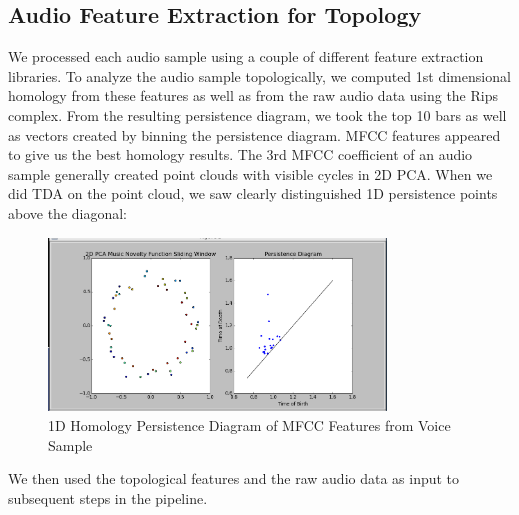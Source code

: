 \documentclass[12pt]{article}
\begin{document}
\subsection{Audio Feature Extraction for Topology}
\-\hspace{1cm} We processed each audio sample using a couple of different
feature extraction libraries. To analyze the audio sample topologically, we
computed 1st dimensional homology from these features as well as from the raw
audio data using the Rips complex. From the resulting persistence diagram, we
took the top 10 bars as well as vectors created by binning the persistence
diagram.
\newline \-\hspace{1cm} MFCC features appeared to give us the best homology
results. The 3rd MFCC coefficient of an audio sample generally created point
clouds with visible cycles in 2D PCA. When we did TDA on the point cloud, we
saw clearly distinguished 1D persistence points above the diagonal:
\newpage
\begin{figure}[!ht]
\centering
\includegraphics[width=0.8\textwidth]{pd.png}
\caption{1D Homology Persistence Diagram of MFCC Features from Voice Sample}
\end{figure}
\-\hspace{1cm} We then used the topological features and the raw audio
data as input to subsequent steps in the pipeline.
\end{document}
